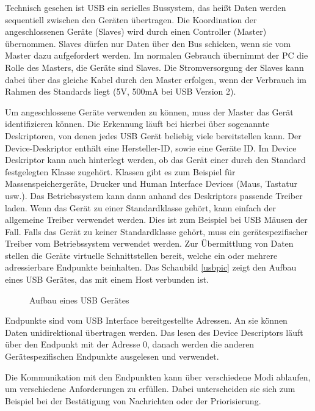 \documentclass[12pt,journal,compsoc]{IEEEtran}
\begin{document}
Technisch gesehen ist USB ein serielles Bussystem, das heißt Daten werden sequentiell zwischen den Geräten übertragen. 
Die Koordination der angeschlossenen Geräte (Slaves) wird durch einen Controller (Master) übernommen.
Slaves dürfen nur Daten über den Bus schicken, wenn sie vom Master dazu aufgefordert werden.
Im normalen Gebrauch übernimmt der PC die Rolle des Masters, die Geräte sind Slaves. Die Stromversorgung der Slaves kann dabei über das gleiche Kabel durch den Master erfolgen, wenn der Verbrauch im Rahmen des Standards liegt (5V, 500mA bei USB Version 2).

Um angeschlossene Geräte verwenden zu können, muss der Master das Gerät identifizieren können. 
Die Erkennung läuft bei hierbei über sogenannte Deskriptoren, von denen jedes USB Gerät beliebig viele bereitstellen kann. 
Der Device-Deskriptor enthält eine Hersteller-ID, sowie eine Geräte ID.
Im Device Deskriptor kann auch hinterlegt werden, ob das Gerät einer durch den Standard festgelegten Klasse zugehört. 
Klassen gibt es zum Beispiel für Massenspeichergeräte, Drucker und Human Interface Devices (Maus, Tastatur usw.).
Das Betriebssystem kann dann anhand des Deskriptors passende Treiber laden. Wenn das Gerät zu einer Standardklasse gehört, kann einfach der allgemeine Treiber verwendet werden. Dies ist zum Beispiel bei USB Mäusen der Fall.
Falls das Gerät zu keiner Standardklasse gehört, muss ein gerätespezifischer Treiber vom Betriebssystem verwendet werden.
Zur Übermittlung von Daten stellen die Geräte virtuelle Schnittstellen bereit, welche ein oder mehrere adressierbare Endpunkte beinhalten. Das Schaubild \ref{usbpic} zeigt den Aufbau eines USB Gerätes, das mit einem Host verbunden ist.

\begin{figure}[h]

	\centering
	\def\svgwidth{\columnwidth}
	
	\caption{Aufbau eines USB Gerätes}
	\label{usbpics}
\end{figure}



Endpunkte sind vom USB Interface bereitgestellte Adressen. An sie können Daten unidirektional übertragen werden.
Das lesen des Device Descriptors läuft über den Endpunkt mit der Adresse 0, danach werden die anderen Gerätespezifischen Endpunkte ausgelesen und verwendet.

Die Kommunikation mit den Endpunkten kann über verschiedene Modi ablaufen, um verschiedene Anforderungen zu erfüllen.
Dabei unterscheiden sie sich zum Beispiel bei der Bestätigung von Nachrichten oder der Priorisierung.  
\end{document}
